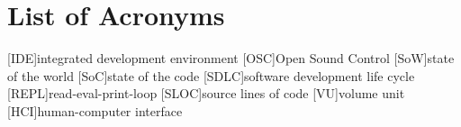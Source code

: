 
\chapter*{List of Acronyms}
\label{chap:acronyms}

\begin{acronym}
[IDE]{integrated development environment}
[OSC]{Open Sound Control}
[SoW]{state of the world}
[SoC]{state of the code}
[SDLC]{software development life cycle}
[REPL]{read-eval-print-loop}
[SLOC]{source lines of code}
[VU]{volume unit}
[HCI]{human-computer interface}
\end{acronym}